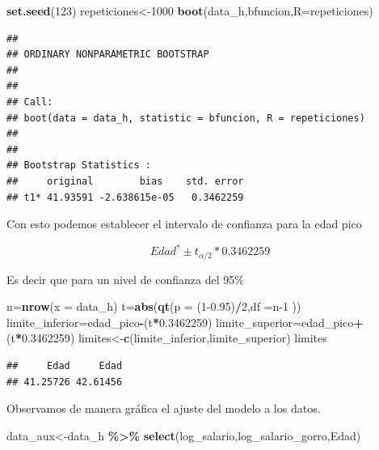 \documentclass[
]{article}
\newenvironment{Shaded}{\begin{snugshade}}{\end{snugshade}}
\newcommand{\AttributeTok}[1]{\textcolor[rgb]{0.13,0.29,0.53}{#1}}
\newcommand{\DecValTok}[1]{\textcolor[rgb]{0.00,0.00,0.81}{#1}}
\newcommand{\FloatTok}[1]{\textcolor[rgb]{0.00,0.00,0.81}{#1}}
\newcommand{\FunctionTok}[1]{\textcolor[rgb]{0.13,0.29,0.53}{\textbf{#1}}}
\newcommand{\NormalTok}[1]{#1}
\newcommand{\OtherTok}[1]{\textcolor[rgb]{0.56,0.35,0.01}{#1}}
\newcommand{\SpecialCharTok}[1]{\textcolor[rgb]{0.81,0.36,0.00}{\textbf{#1}}}
\begin{document}
\begin{Shaded}
\begin{Highlighting}[]
\FunctionTok{set.seed}\NormalTok{(}\DecValTok{123}\NormalTok{)}
\NormalTok{repeticiones}\OtherTok{\textless{}{-}}\DecValTok{1000}
\FunctionTok{boot}\NormalTok{(data\_h,bfuncion,}\AttributeTok{R=}\NormalTok{repeticiones)}
\end{Highlighting}
\end{Shaded}

\begin{verbatim}
## 
## ORDINARY NONPARAMETRIC BOOTSTRAP
## 
## 
## Call:
## boot(data = data_h, statistic = bfuncion, R = repeticiones)
## 
## 
## Bootstrap Statistics :
##     original        bias    std. error
## t1* 41.93591 -2.638615e-05   0.3462259
\end{verbatim}

Con esto podemos establecer el intervalo de confianza para la edad pico

\[Edad^* \pm t_{\alpha/2} * 0.3462259\]

Es decir que para un nivel de confianza del 95\%

\begin{Shaded}
\begin{Highlighting}[]
\NormalTok{n}\OtherTok{=}\FunctionTok{nrow}\NormalTok{(}\AttributeTok{x =}\NormalTok{ data\_h)}
\NormalTok{t}\OtherTok{=}\FunctionTok{abs}\NormalTok{(}\FunctionTok{qt}\NormalTok{(}\AttributeTok{p =}\NormalTok{ (}\DecValTok{1}\FloatTok{{-}0.95}\NormalTok{)}\SpecialCharTok{/}\DecValTok{2}\NormalTok{,}\AttributeTok{df =}\NormalTok{n}\DecValTok{{-}1}\NormalTok{ ))}
\NormalTok{limite\_inferior}\OtherTok{=}\NormalTok{edad\_pico}\SpecialCharTok{{-}}\NormalTok{(t}\SpecialCharTok{*}\FloatTok{0.3462259}\NormalTok{)}
\NormalTok{limite\_superior}\OtherTok{=}\NormalTok{edad\_pico}\SpecialCharTok{+}\NormalTok{(t}\SpecialCharTok{*}\FloatTok{0.3462259}\NormalTok{)}
\NormalTok{limites}\OtherTok{\textless{}{-}}\FunctionTok{c}\NormalTok{(limite\_inferior,limite\_superior)}
\NormalTok{limites}
\end{Highlighting}
\end{Shaded}

\begin{verbatim}
##     Edad     Edad 
## 41.25726 42.61456
\end{verbatim}

Observamos de manera gráfica el ajuste del modelo a los datos.

\begin{Shaded}
\begin{Highlighting}[]
\NormalTok{data\_aux}\OtherTok{\textless{}{-}}\NormalTok{data\_h }\SpecialCharTok{\%\textgreater{}\%} \FunctionTok{select}\NormalTok{(log\_salario,log\_salario\_gorro,Edad)}
\end{Highlighting}
\end{Shaded}
\end{document}
